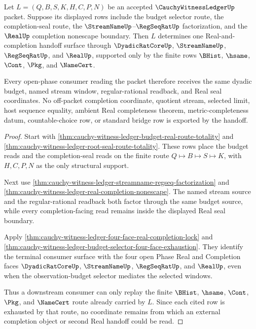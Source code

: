 \begin{theorem}
\label{thm:cauchy-witness-ledger-open-phase-budget-route-handoff}
Let $L=(Q,B,S,K,H,C,P,N)$ be an accepted $\CauchyWitnessLedgerUp$ packet. Suppose its displayed rows include the budget selector route, the completion-seal route, the $\StreamNameUp$--$\RegSeqRatUp$ factorization, and the $\RealUp$ completion nonescape boundary. Then $L$ determines one Real-and-completion handoff surface through $\DyadicRatCoreUp$, $\StreamNameUp$, $\RegSeqRatUp$, and $\RealUp$, supported only by the finite rows $\BHist$, $\hsame$, $\Cont$, $\Pkg$, and $\NameCert$.

Every open-phase consumer reading the packet therefore receives the same dyadic budget, named stream window, regular-rational readback, and Real seal coordinates. No off-packet completion coordinate, quotient stream, selected limit, host sequence equality, ambient Real completeness theorem, metric-completeness datum, countable-choice row, or standard bridge row is exported by the handoff.
\end{theorem}
\begin{proof}
Start with \autoref{thm:cauchy-witness-ledger-budget-real-route-totality} and \autoref{thm:cauchy-witness-ledger-root-seal-route-totality}. These rows place the budget reads and the completion-seal reads on the finite route $Q \longmapsto B \longmapsto S \longmapsto K$, with $H,C,P,N$ as the only structural support.

Next use \autoref{thm:cauchy-witness-ledger-streamname-regseq-factorization} and \autoref{thm:cauchy-witness-ledger-real-completion-nonescape}. The named stream source and the regular-rational readback both factor through the same budget source, while every completion-facing read remains inside the displayed Real seal boundary.

Apply \autoref{thm:cauchy-witness-ledger-four-face-real-completion-lock} and \autoref{thm:cauchy-witness-ledger-budget-selector-four-face-exhaustion}. They identify the terminal consumer surface with the four open Phase Real and Completion faces $\DyadicRatCoreUp$, $\StreamNameUp$, $\RegSeqRatUp$, and $\RealUp$, even when the observation-budget selector mediates the selected windows.

Thus a downstream consumer can only replay the finite $\BHist$, $\hsame$, $\Cont$, $\Pkg$, and $\NameCert$ route already carried by $L$. Since each cited row is exhausted by that route, no coordinate remains from which an external completion object or second Real handoff could be read.
\end{proof}

